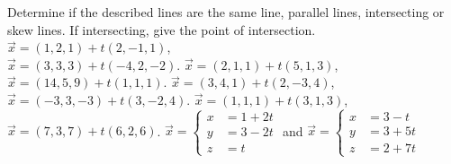 

\begin{Exercise}[
name={},
title={}, 
difficulty=0,
origin={\cite{GHC}}]
Determine if the described lines are the same line, parallel lines, intersecting or skew lines. If intersecting, give the point of intersection.
\Question $\vec x = (1,2,1) + t(2,-1,1)$,\\
$\vec x = (3,3,3) + t(-4,2,-2)$.
\Question $\vec x = (2,1,1) + t(5,1,3)$,\\
$\vec x = (14,5,9) + t(1,1,1)$.
\Question $\vec x = (3,4,1) + t(2,-3,4)$,\\
$\vec x = (-3,3,-3) + t(3,-2,4)$.
\Question $\vec x = (1,1,1) + t(3,1,3)$,\\
$\vec x = (7,3,7) + t(6,2,6)$.
\Question $\vec x = \left\{\begin{aligned} x&= 1+2t\\ y&= 3-2t\\ z&= t\end{aligned}\right.$ \quad and \quad
$\vec x = \left\{\begin{aligned} x&= 3-t\\ y&= 3+5t\\ z&= 2+7t\end{aligned}\right.$

\end{Exercise}
